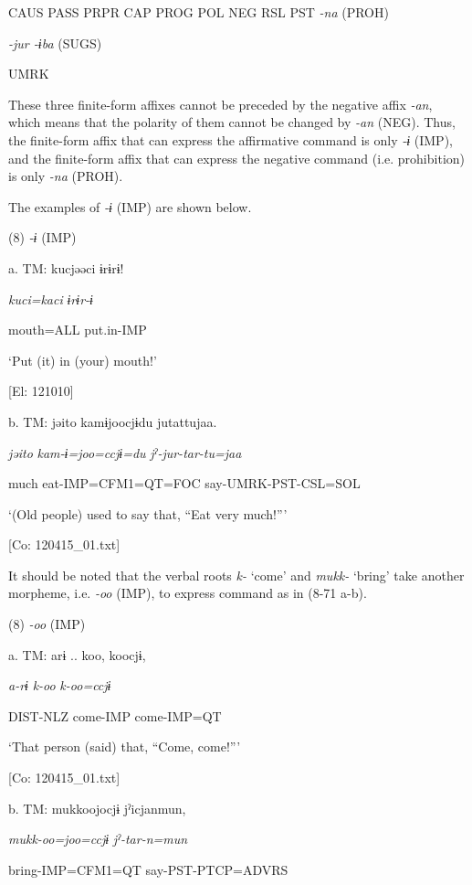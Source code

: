     CAUS  PASS  PRPR  CAP  PROG  POL  NEG  RSL  PST    \textit{{}-na} (PROH)

          \textit{{}-jur      {}-ɨba} (SUGS)

          UMRK      

These three finite-form affixes cannot be preceded by the negative affix \textit{{}-an}, which means that the polarity of them cannot be changed by \textit{{}-an} (NEG). Thus, the finite-form affix that can express the affirmative command is only \textit{{}-ɨ} (IMP), and the finite-form affix that can express the negative command (i.e. prohibition) is only \textit{{}-na} (PROH).

  The examples of \textit{{}-ɨ} (IMP) are shown below.

(8)  \textit{{}-ɨ} (IMP)

  a.  TM:  kucjəəci  ɨrɨrɨ!

      \textit{kuci=kaci}  \textit{ɨrɨr-ɨ}

      mouth=ALL  put.in-IMP

      ‘Put (it) in (your) mouth!’

      [El: 121010]

  b.  TM:  jəito  kamɨjoocjɨdu  jutattujaa.

      \textit{jəito}  \textit{kam-ɨ=joo=ccjɨ=du}  \textit{jˀ-jur-tar-tu=jaa}

      much  eat-IMP=CFM1=QT=FOC  say-UMRK-PST-CSL=SOL

      ‘(Old people) used to say that, “Eat very much!”’

      [Co: 120415\_01.txt]

It should be noted that the verbal roots \textit{k-} ‘come’ and \textit{mukk-} ‘bring’ take another morpheme, i.e. \textit{{}-oo} (IMP), to express command as in (8-71 a-b).

(8)  \textit{{}-oo} (IMP)

  a.  TM:  arɨ ..  koo,  koocjɨ,

      \textit{a-rɨ}  \textit{k-oo}  \textit{k-oo=ccjɨ}

      DIST-NLZ  come-IMP  come-IMP=QT

      ‘That person (said) that, “Come, come!”’

      [Co: 120415\_01.txt]

  b.  TM:  mukkoojocjɨ  jˀicjanmun,

      \textit{mukk-oo=joo=ccjɨ}  \textit{jˀ-tar-n=mun}

      bring-IMP=CFM1=QT  say-PST-PTCP=ADVRS

